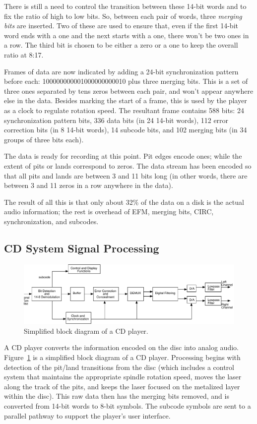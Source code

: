 There is still a need to control the transition between these 14-bit
words and to fix the ratio of high to low bits. So, between each pair
of words, three \emph{merging bits} are inserted. Two of these are
used to ensure that, even if the first 14-bit word ends with a one and
the next starts with a one, there won't be two ones in a row. The
third bit is chosen to be either a zero or a one to keep the overall
ratio at 8:17.

Frames of data are now indicated by adding a 24-bit synchronization
pattern before each: 100000000001000000000010 plus three merging
bits.  This is a set of three ones separated by tens zeros between
each pair, and won't appear anywhere else in the data. Besides marking
the start of a frame, this is used by the player as a clock to
regulate rotation speed. The resultant frame contains 588 bits: 24
synchronization pattern bits, 336 data bits (in 24 14-bit words), 112
error correction bits (in 8 14-bit words), 14 subcode bits, and 102
merging bits (in 34 groups of three bits each).

The data is ready for recording at this point. Pit edges encode ones;
while the extent of pits or lands correspond to zeros. The data stream
has been encoded so that all pits and lands are between 3 and 11 bits
long (in other words, there are between 3 and 11 zeros in a row
anywhere in the data).

The result of all this is that only about 32\% of the data on a disk
is the actual audio information; the rest is overhead of EFM, merging
bits, CIRC, synchronization, and subcodes.

\subsection{CD System Signal Processing}

\begin{figure}
\centerline{\includegraphics[width=\textwidth]{ch-rev/fig10-2}}
\caption{Simplified block diagram of a CD player.\label{fg:cd-player}}
\end{figure}

A CD player converts the information encoded on the disc into analog
audio. Figure~\ref{fg:cd-player} is a simplified block diagram of a CD
player. Processing begins with detection of the pit/land transitions
from the disc (which includes a control system that maintains the
appropriate spindle rotation speed, moves the laser along the track of
the pits, and keeps the laser focused on the metalized layer within
the disc). This raw data then has the merging bits removed, and is
converted from 14-bit words to 8-bit symbols. The subcode symbols are
sent to a parallel pathway to support the player's user interface.

